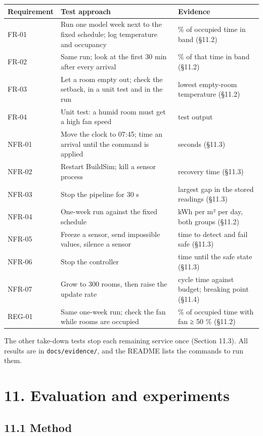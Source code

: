 \documentclass[11pt]{article}
\begin{document}
\begin{longtable}{@{}L{0.16}L{0.5}L{0.34}@{}}
\toprule
\textbf{Requirement} & \textbf{Test approach} & \textbf{Evidence} \\
\midrule
\endhead
\bottomrule
\endlastfoot
FR-01 & Run one model week next to the fixed schedule; log temperature and occupancy & \% of occupied time in band (§11.2) \\
FR-02 & Same run; look at the first 30 min after every arrival & \% of that time in band (§11.2) \\
FR-03 & Let a room empty out; check the setback, in a unit test and in the run & lowest empty-room temperature (§11.2) \\
FR-04 & Unit test: a humid room must get a high fan speed & test output \\
NFR-01 & Move the clock to 07:45; time an arrival until the command is applied & seconds (§11.3) \\
NFR-02 & Restart BuildSim; kill a sensor process & recovery time (§11.3) \\
NFR-03 & Stop the pipeline for 30 s & largest gap in the stored readings (§11.3) \\
NFR-04 & One-week run against the fixed schedule & kWh per m² per day, both groups (§11.2) \\
NFR-05 & Freeze a sensor, send impossible values, silence a sensor & time to detect and fail safe (§11.3) \\
NFR-06 & Stop the controller & time until the safe state (§11.3) \\
NFR-07 & Grow to 300 rooms, then raise the update rate & cycle time against budget; breaking point (§11.4) \\
REG-01 & Same one-week run; check the fan while rooms are occupied & \% of occupied time with fan ≥ 50 \% (§11.2) \\
\end{longtable}

The other take-down tests stop each remaining service once (Section 11.3). All results are in
\texttt{docs/evidence/}, and the README lists the commands to run them.

\section{11. Evaluation and experiments}\label{evaluation}

\subsection{11.1 Method}
\end{document}
